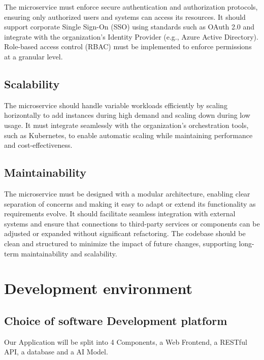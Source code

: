 \documentclass[conference]{IEEEtran}
\begin{document}
            The microservice must enforce secure authentication and authorization protocols, ensuring only authorized users and systems can access its resources. It should support corporate Single Sign-On (SSO) using standards such as OAuth 2.0 and integrate with the organization's Identity Provider (e.g., Azure Active Directory). Role-based access control (RBAC) must be implemented to enforce permissions at a granular level.
        
        \subsection{Scalability}
        
            The microservice should handle variable workloads efficiently by scaling horizontally to add instances during high demand and scaling down during low usage. It must integrate seamlessly with the organization's orchestration tools, such as Kubernetes, to enable automatic scaling while maintaining performance and cost-effectiveness.
            
        \subsection{Maintainability}

            The microservice must be designed with a modular architecture, enabling clear separation of concerns and making it easy to adapt or extend its functionality as requirements evolve. It should facilitate seamless integration with external systems and ensure that connections to third-party services or components can be adjusted or expanded without significant refactoring. The codebase should be clean and structured to minimize the impact of future changes, supporting long-term maintainability and scalability.
    
    \section{Development environment}

        \subsection{Choice of software Development platform}

            Our Application will be split into 4 Components, a Web Frontend, a RESTful API, a database and a AI Model.
            \newline
\end{document}
